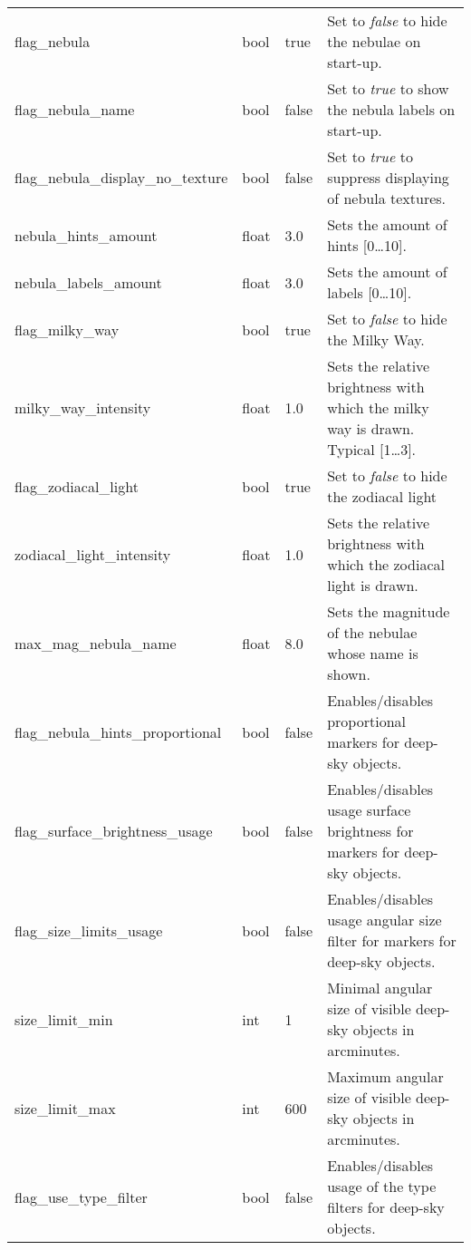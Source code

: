 \begin{longtable}{l|l|l|p{55mm}}
flag\_nebula                       & bool   & true  & Set to \emph{false} to hide the nebulae on start-up. \\%
flag\_nebula\_name                 & bool   & false & Set to \emph{true} to show the nebula labels on start-up. \\%
flag\_nebula\_display\_no\_texture & bool   & false & Set to \emph{true} to suppress displaying of nebula textures. \\%
nebula\_hints\_amount              & float  & 3.0   & Sets the amount of hints [0\ldots10]. \\%
nebula\_labels\_amount             & float  & 3.0   & Sets the amount of labels [0\ldots10].\\%
flag\_milky\_way                   & bool   & true  & Set to \emph{false} to hide the Milky Way.\\%
milky\_way\_intensity              & float  & 1.0   & Sets the relative brightness with which the milky way is drawn. Typical [1\ldots3]. \\%
flag\_zodiacal\_light              & bool   & true  & Set to \emph{false} to hide the zodiacal light\\%
zodiacal\_light\_intensity         & float  & 1.0   & Sets the relative brightness with which the zodiacal light is drawn. \\%
max\_mag\_nebula\_name             & float  & 8.0   & Sets the magnitude of the nebulae whose name is shown. \\%
flag\_nebula\_hints\_proportional  & bool   & false & Enables/disables proportional markers for deep-sky objects. \\%
flag\_surface\_brightness\_usage   & bool   & false & Enables/disables usage surface brightness for markers for deep-sky objects.\\\midrule
%
flag\_size\_limits\_usage          & bool   & false & Enables/disables usage angular size filter for markers for deep-sky objects.\\%
size\_limit\_min                   & int    & 1     & Minimal angular size of visible deep-sky objects in arcminutes.\\%
size\_limit\_max                   & int    & 600   & Maximum angular size of visible deep-sky objects in arcminutes.\\\midrule
%
flag\_use\_type\_filter            & bool   & false & Enables/disables usage of the type filters for deep-sky objects. \\\midrule

\end{longtable}
